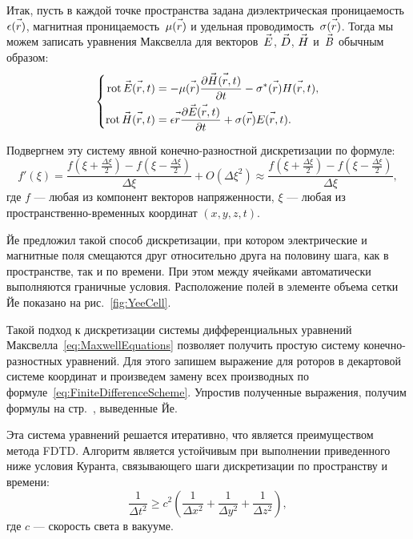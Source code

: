 Итак, пусть в каждой точке пространства задана диэлектрическая
проницаемость~$\epsilon(\vec{r\mathstrut})$, магнитная проницаемость~$\mu(\vec{r\mathstrut})$
и удельная проводимость~$\sigma(\vec{r\mathstrut})$. Тогда мы можем записать уравнения
Максвелла для векторов~$\vec{E\mathstrut}$, $\vec{D\mathstrut}$, $\vec{H\mathstrut}$ и~$\vec{B\mathstrut}$ обычным
образом:
\begin{equation}
    \label{eq:MaxwellEquations}
    \left\{
    \begin{aligned}
        \operatorname{rot}{\vec{E\mathstrut}(\vec{r\mathstrut},t)} &=
            -\mu(\vec{r\mathstrut})\frac{\partial\vec{H\mathstrut}(\vec{r\mathstrut},t)}{\partial t}
            -\sigma^*(\vec{r\mathstrut})H(\vec{r\mathstrut},t), \\
        \operatorname{rot}{\vec{H\mathstrut}}(\vec{r\mathstrut},t) &=
            \epsilon{\ensuremath{\vec{r\mathstrut}}}\frac{\partial\vec{E\mathstrut}(\vec{r\mathstrut},t)}{\partial t} +
            \sigma(\vec{r\mathstrut})E(\vec{r\mathstrut},t).
    \end{aligned}
    \right.
\end{equation}

Подвергнем эту систему явной конечно-разностной дискретизации по формуле:
\vspace{-0.3cm}
\begin{equation}
    \label{eq:FiniteDifferenceScheme}
    f'(\xi) =
        \frac{f(\xi+\frac{\Delta\xi}{2})-f(\xi-\frac{\Delta\xi}{2})}{\Delta\xi}
        + O(\Delta\xi^2) \approx
        \frac{f(\xi+\frac{\Delta\xi}{2})-f(\xi-\frac{\Delta\xi}{2})}{\Delta\xi},
\end{equation}
где $f$ --- любая из компонент векторов напряженности,
    $\xi$ --- любая из пространственно-временных координат $(x,y,z,t)$.

Йе предложил такой способ дискретизации, при котором электрические и магнитные
поля смещаются друг относительно друга на половину шага, как в пространстве,
так и по времени. При этом между ячейками автоматически выполняются граничные
условия. Расположение полей в элементе объема сетки Йе показано на
рис.~\ref{fig:YeeCell}.

Такой подход к дискретизации системы дифференциальных уравнений
Максвелла~\eqref{eq:MaxwellEquations} позволяет получить простую систему
конечно-разностных уравнений. Для этого запишем выражение для роторов
в декартовой системе координат и произведем замену всех производных по
формуле~\eqref{eq:FiniteDifferenceScheme}. Упростив полученные выражения,
получим формулы на стр.~\pageref{eq:BaseFdtdEquations}, выведенные Йе.

Эта система уравнений решается итеративно, что является преимуществом метода
FDTD. Алгоритм является устойчивым при выполнении приведенного ниже условия
Куранта, связывающего шаги дискретизации по пространству и времени:
\begin{equation}
\label{eq:CourantCondition}
\frac{1}{\Delta t^2} \ge c^2
\left(
    \frac{1}{\Delta x^2} +
    \frac{1}{\Delta y^2} +
    \frac{1}{\Delta z^2}
\right),
\end{equation}
где $c$ --- скорость света в вакууме.

